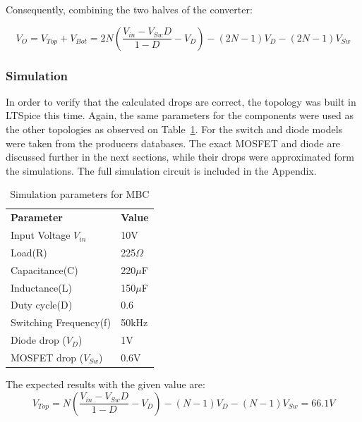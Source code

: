 Consequently, combining the two halves of the converter: 

\begin{equation}
	V_{O}=V_{Top}+V_{Bot}=2N( \frac{V_{in}-V_{Sw}D}{1-D}-V_D)-(2N-1)V_D-(2N-1)V_{Sw}
	\label{eq:DROPS_2INX_FINAL}
\end{equation}

\subsubsection{Simulation}
In order to verify that the calculated drops are correct,
the topology was built in LTSpice this time. 
Again, the same parameters for the components were used as the other topologies as observed on Table~\ref{tab:MBC_2Nx}. For the switch and diode models were taken from the producers databases. The exact MOSFET and diode are discussed further in the next sections, while their drops were approximated form the simulations. The full simulation circuit is included in the Appendix. 

\begin{table}[H]
\begin{center}
\caption {Simulation parameters for MBC} \label{tab:MBC_2Nx} 
\begin{tabular}{|l|l|}
\cline{1-2}
\textbf{Parameter} & \textbf{Value}  \\ \cline{1-2}
Input Voltage $V_{in}$          &      10V   \\ \cline{1-2}
Load(R)   & 225$\Omega$           \\ \cline{1-2}
Capacitance(C)          &       220$\mu$F     \\ \cline{1-2}
Inductance(L)          &      150$\mu$F      \\ \cline{1-2}
Duty cycle(D)          &     0.6       \\ \cline{1-2}
Switching Frequency(f)          &      50kHz      \\ \cline{1-2}
Diode drop ($V_D$)          &     1V       \\ \cline{1-2}
MOSFET drop ($V_{Sw}$)          &     0.6V       \\ \cline{1-2}
\end{tabular}
\end{center}
\end{table}

The expected results with the given value are: 
\begin{equation}
	V_{Top}= N( \frac{V_{in}-V_{Sw}D}{1-D}-V_D)-(N-1)V_D-(N-1)V_{Sw}= 66.1V
	\label{eq:DROPS_NX_SIM}
\end{equation}


